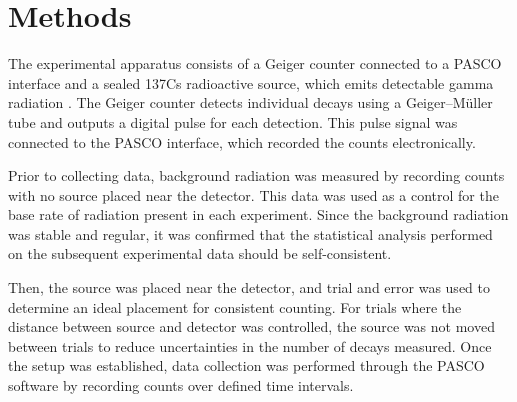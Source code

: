 \documentclass[letterpaper,12pt]{article}
\begin{document}






\section{Methods}

The experimental apparatus consists of a Geiger counter connected to a PASCO interface and a sealed 137Cs radioactive source, which emits detectable gamma radiation \cite{LabManual4}. The Geiger counter detects individual decays using a Geiger–Müller tube and outputs a digital pulse for each detection. This pulse signal was connected to the PASCO interface, which recorded the counts electronically. 

Prior to collecting data, background radiation was measured by recording counts with no source placed near the detector. This data was used as a control for the base rate of radiation present in each experiment. Since the background radiation was stable and regular, it was confirmed that the statistical analysis performed on the subsequent experimental data should be self-consistent. 

Then, the source was placed near the detector, and trial and error was used to determine an ideal placement for consistent counting. For trials where the distance between source and detector was controlled, the source was not moved between trials to reduce uncertainties in the number of decays measured. Once the setup was established, data collection was performed through the PASCO software by recording counts over defined time intervals. 
\end{document}

